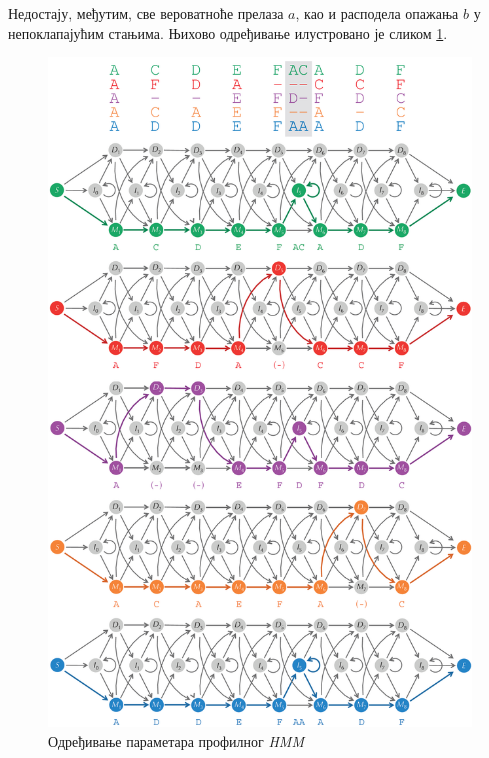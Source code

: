 \documentclass[12pt,oneside]{memoir}
\begin{document}
\begin{CJK}{UTF8}{ipxm}
Недостају, међутим, све вероватноће прелаза $a$, као и расподела опажања $b$ у непоклапајућим стањима. Њихово одређивање илустровано је сликом \ref{fig:prof_param}.

\begin{figure}[H]
  \centering
  \includegraphics[height=.97\textheight]{prof_param.png}
  \caption{Одређивање параметара профилног \textit{HMM}\cite{compeau2015}}
  \label{fig:prof_param}
\end{figure}


\end{CJK}
\end{document}
